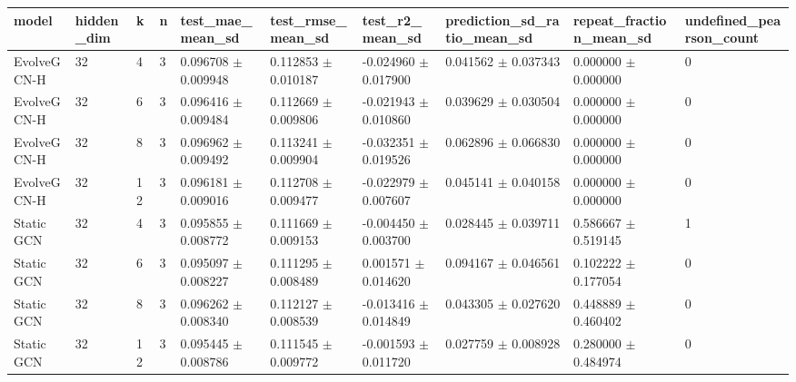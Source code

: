 \begin{tabular}{llllllllll}
\hline
model & hidden\_dim & k & n & test\_mae\_mean\_sd & test\_rmse\_mean\_sd & test\_r2\_mean\_sd & prediction\_sd\_ratio\_mean\_sd & repeat\_fraction\_mean\_sd & undefined\_pearson\_count \\
\hline
EvolveGCN-H & 32 & 4 & 3 & 0.096708 $\pm$ 0.009948 & 0.112853 $\pm$ 0.010187 & -0.024960 $\pm$ 0.017900 & 0.041562 $\pm$ 0.037343 & 0.000000 $\pm$ 0.000000 & 0 \\
EvolveGCN-H & 32 & 6 & 3 & 0.096416 $\pm$ 0.009484 & 0.112669 $\pm$ 0.009806 & -0.021943 $\pm$ 0.010860 & 0.039629 $\pm$ 0.030504 & 0.000000 $\pm$ 0.000000 & 0 \\
EvolveGCN-H & 32 & 8 & 3 & 0.096962 $\pm$ 0.009492 & 0.113241 $\pm$ 0.009904 & -0.032351 $\pm$ 0.019526 & 0.062896 $\pm$ 0.066830 & 0.000000 $\pm$ 0.000000 & 0 \\
EvolveGCN-H & 32 & 12 & 3 & 0.096181 $\pm$ 0.009016 & 0.112708 $\pm$ 0.009477 & -0.022979 $\pm$ 0.007607 & 0.045141 $\pm$ 0.040158 & 0.000000 $\pm$ 0.000000 & 0 \\
Static GCN & 32 & 4 & 3 & 0.095855 $\pm$ 0.008772 & 0.111669 $\pm$ 0.009153 & -0.004450 $\pm$ 0.003700 & 0.028445 $\pm$ 0.039711 & 0.586667 $\pm$ 0.519145 & 1 \\
Static GCN & 32 & 6 & 3 & 0.095097 $\pm$ 0.008227 & 0.111295 $\pm$ 0.008489 & 0.001571 $\pm$ 0.014620 & 0.094167 $\pm$ 0.046561 & 0.102222 $\pm$ 0.177054 & 0 \\
Static GCN & 32 & 8 & 3 & 0.096262 $\pm$ 0.008340 & 0.112127 $\pm$ 0.008539 & -0.013416 $\pm$ 0.014849 & 0.043305 $\pm$ 0.027620 & 0.448889 $\pm$ 0.460402 & 0 \\
Static GCN & 32 & 12 & 3 & 0.095445 $\pm$ 0.008786 & 0.111545 $\pm$ 0.009772 & -0.001593 $\pm$ 0.011720 & 0.027759 $\pm$ 0.008928 & 0.280000 $\pm$ 0.484974 & 0 \\
\hline
\end{tabular}
